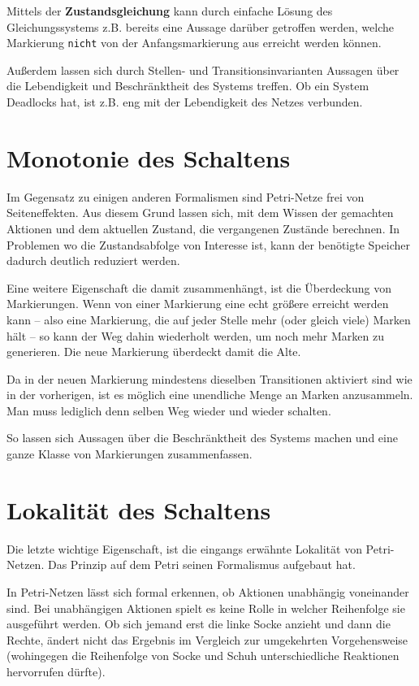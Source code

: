 Mittels der \textbf{Zustandsgleichung} kann durch einfache Lösung des Gleichungssystems z.B. bereits eine Aussage darüber getroffen werden, welche Markierung \texttt{nicht} von der Anfangsmarkierung aus erreicht werden können.

Außerdem lassen sich durch Stellen- und Transitionsinvarianten Aussagen über die Lebendigkeit und Beschränktheit des Systems treffen.
Ob ein System Deadlocks hat, ist z.B. eng mit der Lebendigkeit des Netzes verbunden.

\section{Monotonie des Schaltens}
\label{monoton}
Im Gegensatz zu einigen anderen Formalismen sind Petri-Netze frei von Seiteneffekten.
Aus diesem Grund lassen sich, mit dem Wissen der gemachten Aktionen und dem aktuellen Zustand, die vergangenen Zustände berechnen.
In Problemen wo die Zustandsabfolge von Interesse ist, kann der benötigte Speicher dadurch deutlich reduziert werden.

Eine weitere Eigenschaft die damit zusammenhängt, ist die Überdeckung von Markierungen.
Wenn von einer Markierung eine echt größere erreicht werden kann -- also eine Markierung, die auf jeder Stelle mehr (oder gleich viele) Marken hält -- so kann der Weg dahin wiederholt werden, um noch mehr Marken zu generieren.
Die neue Markierung überdeckt damit die Alte.

Da in der neuen Markierung mindestens dieselben Transitionen aktiviert sind wie in der vorherigen, ist es möglich eine unendliche Menge an Marken anzusammeln.
Man muss lediglich denn selben Weg wieder und wieder schalten.

So lassen sich Aussagen über die Beschränktheit des Systems machen und eine ganze Klasse von Markierungen zusammenfassen.

\section{Lokalität des Schaltens}
\label{lokal}
Die letzte wichtige Eigenschaft, ist die eingangs erwähnte Lokalität von Petri-Netzen.
Das Prinzip auf dem Petri seinen Formalismus aufgebaut hat.

In Petri-Netzen lässt sich formal erkennen, ob Aktionen unabhängig voneinander sind.
Bei unabhängigen Aktionen spielt es keine Rolle in welcher Reihenfolge sie ausgeführt werden.
Ob sich jemand erst die linke Socke anzieht und dann die Rechte, ändert nicht das Ergebnis im Vergleich zur umgekehrten Vorgehensweise 
(wohingegen die Reihenfolge von Socke und Schuh unterschiedliche Reaktionen hervorrufen dürfte).

